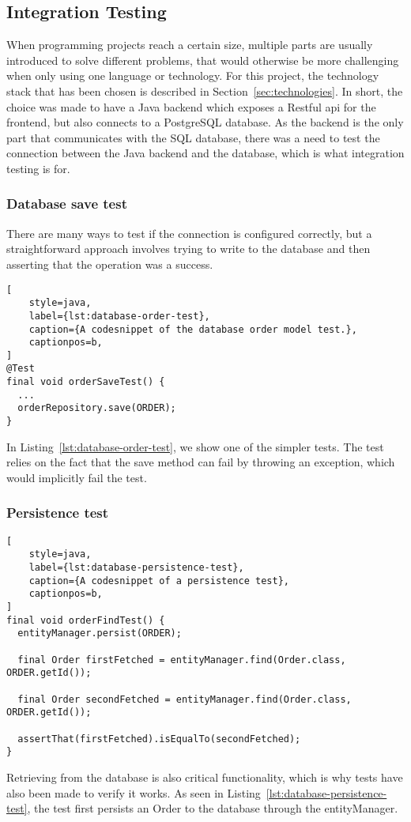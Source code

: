 \subsection{Integration Testing}\label{subsec:integration-tests}

When programming projects reach a certain size, multiple parts are usually introduced to solve different problems,
that would otherwise be more challenging when only using one language or technology.
For this project, the technology stack that has been chosen is described in Section~\ref{sec:technologies}.
In short, the choice was made to have a Java backend which exposes a Restful api for the frontend, but also connects to
a PostgreSQL database.
As the backend is the only part that communicates with the SQL database, there was a need to test the connection between
the Java backend and the database, which is what integration testing is for.

\subsubsection{Database save test}\label{subsubsec:database-save-integration-test}

There are many ways to test if the connection is configured correctly, but a straightforward approach involves trying
to write to the database and then asserting that the operation was a success.

\begin{lstlisting}[
    style=java,
    label={lst:database-order-test},
    caption={A codesnippet of the database order model test.},
    captionpos=b,
]
@Test
final void orderSaveTest() {
  ...
  orderRepository.save(ORDER);
}
\end{lstlisting}

In Listing~\ref{lst:database-order-test}, we show one of the simpler tests.
The test relies on the fact that the save method can fail by throwing an exception, which would implicitly fail the
test.
\subsubsection{Persistence test}\label{subsubsec:persistence-integration-test}
\begin{lstlisting}[
    style=java,
    label={lst:database-persistence-test},
    caption={A codesnippet of a persistence test},
    captionpos=b,
]
final void orderFindTest() {
  entityManager.persist(ORDER);

  final Order firstFetched = entityManager.find(Order.class, ORDER.getId());

  final Order secondFetched = entityManager.find(Order.class, ORDER.getId());

  assertThat(firstFetched).isEqualTo(secondFetched);
}
\end{lstlisting}

Retrieving from the database is also critical functionality, which is why tests have also been made to verify it works.
As seen in Listing~\ref{lst:database-persistence-test}, the test first persists an Order to the database through the
entityManager.
